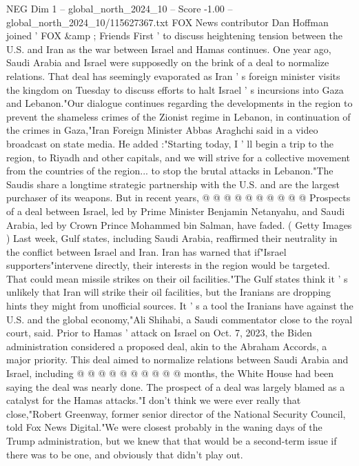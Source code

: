 \begin{textsample}{NEG Dim 1 – global\_north\_2024\_10 – Score -1.00 – global\_north\_2024\_10/115627367.txt}  \label{ex:f1_neg_070}
FOX News contributor Dan Hoffman joined ' FOX \&amp ; Friends First ' to discuss heightening tension between the U.S. and Iran as the war between Israel and Hamas continues.
One year ago, Saudi Arabia and Israel were supposedly on the brink of a deal to normalize relations.
That deal has seemingly evaporated as Iran ' s foreign minister visits the kingdom on Tuesday to discuss efforts to halt Israel ' s incursions into Gaza and Lebanon."Our dialogue continues regarding the developments in the region to prevent the shameless crimes of the Zionist regime in Lebanon, in continuation of the crimes in Gaza,"Iran Foreign Minister Abbas Araghchi said in a video broadcast on state media.
He added :"Starting today, I ' ll begin a trip to the region, to Riyadh and other capitals, and we will strive for a collective movement from the countries of the region... to stop the brutal attacks in Lebanon."The Saudis share a longtime strategic partnership with the U.S. and are the largest purchaser of its weapons.
But in recent years, @ @ @ @ @ @ @ @ @ @ Prospects of a deal between Israel, led by Prime Minister Benjamin Netanyahu, and Saudi Arabia, led by Crown Prince Mohammed bin Salman, have faded. ( Getty Images ) Last week, Gulf states, including Saudi Arabia, reaffirmed their neutrality in the conflict between Israel and Iran.
Iran has warned that if"Israel supporters"intervene directly, their interests in the region would be targeted.
That could mean missile strikes on their oil facilities."The Gulf states think it ' s unlikely that Iran will strike their oil facilities, but the Iranians are dropping hints they might from unofficial sources.
It ' s a tool the Iranians have against the U.S. and the global economy,"Ali Shihabi, a Saudi commentator close to the royal court, said.
Prior to Hamas ' attack on Israel on Oct. 7, 2023, the Biden administration considered a proposed deal, akin to the Abraham Accords, a major priority.
This deal aimed to normalize relations between Saudi Arabia and Israel, including @ @ @ @ @ @ @ @ @ @ months, the White House had been saying the deal was nearly done.
The prospect of a deal was largely blamed as a catalyst for the Hamas attacks."I don't think we were ever really that close,"Robert Greenway, former senior director of the National Security Council, told Fox News Digital."We were closest probably in the waning days of the Trump administration, but we knew that that would be a second-term issue if there was to be one, and obviously that didn't play out.

\end{textsample}
